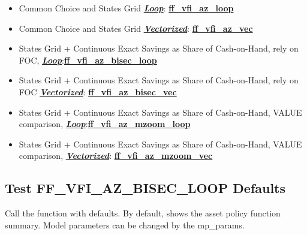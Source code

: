 \documentclass[
]{book}
\begin{document}
\begin{itemize}
\item
  Common Choice and States Grid \underline{\textbf{\emph{Loop}}}:
  \href{https://github.com/FanWangEcon/MEconTools/blob/master/MEconTools/vfi/ff_vfi_az_loop.m}{\textbf{ff\_vfi\_az\_loop}}
\item
  Common Choice and States Grid \underline{\textbf{\emph{Vectorized}}}:
  \href{https://github.com/FanWangEcon/MEconTools/blob/master/MEconTools/vfi/ff_vfi_az_vec.m}{\textbf{ff\_vfi\_az\_vec}}
\item
  States Grid + Continuous Exact Savings as Share of Cash-on-Hand,
  rely on FOC, \underline{\textbf{\emph{Loop}}}:\href{https://github.com/FanWangEcon/MEconTools/blob/master/MEconTools/vfi/ff_vfi_az_bisec_loop.m}{\textbf{ff\_vfi\_az\_bisec\_loop}}
\item
  States Grid + Continuous Exact Savings as Share of Cash-on-Hand,
  rely on FOC \underline{\textbf{\emph{Vectorized}}}:
  \href{https://github.com/FanWangEcon/MEconTools/blob/master/MEconTools/vfi/ff_vfi_az_bisec_vec.m}{\textbf{ff\_vfi\_az\_bisec\_vec}}
\item
  States Grid + Continuous Exact Savings as Share of Cash-on-Hand,
  VALUE comparison, \underline{\textbf{\emph{Loop}}}:\href{https://github.com/FanWangEcon/MEconTools/blob/master/MEconTools/vfi/ff_vfi_az_mzoom_loop.m}{\textbf{ff\_vfi\_az\_mzoom\_loop}}
\item
  States Grid + Continuous Exact Savings as Share of Cash-on-Hand,
  VALUE comparison, \underline{\textbf{\emph{Vectorized}}}:
  \href{https://github.com/FanWangEcon/MEconTools/blob/master/MEconTools/vfi/ff_vfi_az_mzoom_vec.m}{\textbf{ff\_vfi\_az\_mzoom\_vec}}
\end{itemize}

\hypertarget{test-ff_vfi_az_bisec_loop-defaults}{%
\subsection{Test FF\_VFI\_AZ\_BISEC\_LOOP Defaults}\label{test-ff_vfi_az_bisec_loop-defaults}}

Call the function with defaults. By default, shows the asset policy
function summary. Model parameters can be changed by the mp\_params.
\end{document}
